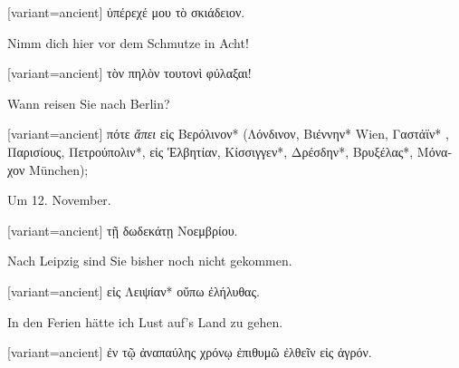 \switchcolumn

\begin{greek}[variant=ancient]%
ὑπέρεχέ μου τὸ σκιάδειον.

\end{greek}%
\switchcolumn*

Nimm dich hier vor dem Schmutze in Acht!

\switchcolumn

\begin{greek}[variant=ancient]%
τὸν πηλὸν τουτονὶ φύλαξαι!

\end{greek}%
\indent Wann reisen Sie nach Berlin?

\switchcolumn

\begin{greek}[variant=ancient]%
πότε \emph{ἄπει} εἰς Βερόλινον{*} (Λόνδινον, Βιέννην{*} \textgerman[spelling=old,babelshorthands=true]{Wien,}
Γαστάϊν{*} , Παρισίους, Πετρούπολιν{*}, εἰς Ἑλβητίαν, Κίσσιγγεν{*},
Δρέσδην{*}, Βρυξέλας{*}, Μόναχον \textgerman[spelling=old,babelshorthands=true]{München});

\end{greek}%
\switchcolumn*

Um 12. November.

\switchcolumn

\begin{greek}[variant=ancient]%
τῇ δωδεκάτῃ Νοεμβρίου.

\end{greek}%
\switchcolumn*

Nach Leipzig sind Sie bis\textcompwordmark{}her noch nicht gekommen.

\switchcolumn

\begin{greek}[variant=ancient]%
εἰς Λειψίαν{*} οὔπω ἐλήλυθας.

\end{greek}%
\switchcolumn*

In den Ferien hätte ich Lust auf's Land zu gehen.

\switchcolumn

\begin{greek}[variant=ancient]%
ἐν τῷ ἀναπαύλης χρόνῳ ἐπιθυμῶ ἐλθεῖν εἰς ἀγρόν.

\end{greek}%
\switchcolumn*

